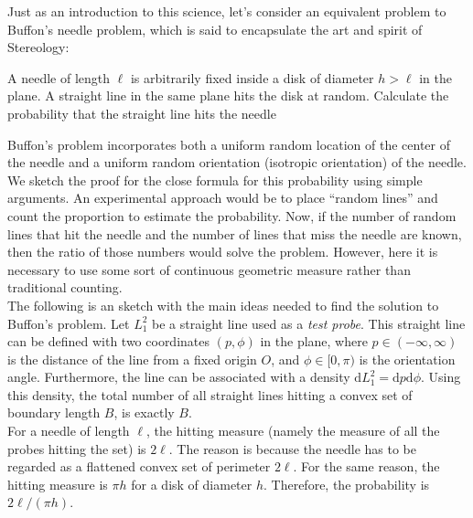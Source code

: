 Just as an introduction to this science, let's consider an equivalent problem to Buffon's needle problem, which is said to encapsulate the art and spirit of Stereology:\\
\begin{tcolorbox}
A needle of length $\ell$ is arbitrarily fixed inside a disk of diameter $h > \ell$ in the plane. A straight line in the same plane hits the disk at random. Calculate the probability that the straight line hits the needle\\
\end{tcolorbox}
Buffon's problem incorporates both a uniform random location of the center of the needle and a uniform random orientation (isotropic orientation) of the needle. We sketch the proof for the close formula for this probability using simple arguments. 
An experimental approach would be to place ``random lines'' and count the proportion to estimate the probability.  
Now, if the number of random lines that hit the needle and the number of lines that miss the needle are known, then the ratio of those numbers would solve the problem. However, here it is necessary to use some sort of continuous geometric measure rather than traditional counting.\\

The following is an sketch with the main ideas needed to find the solution to Buffon's problem.
Let $L_1^2$ be a straight line used as a \textit{test probe}. This straight line can be defined with two coordinates $(p,\phi)$ in the plane, where $p \in (-\infty,\infty)$ is the distance of the line from a fixed origin $O$, and $\phi \in [0,\pi)$ is the orientation angle. Furthermore, the line can be associated with a density $\mathrm{d}L_1^2=\mathrm{d}p\mathrm{d}\phi$. Using this density, the total number of all straight lines hitting a convex set of boundary length $B$, is exactly $B$.\\

For a needle of length $\ell$, the hitting measure (namely the measure of all the probes hitting the set) is $2\ell$. The reason is because the needle has to be regarded as a flattened convex set of perimeter $2\ell$. For the same reason, the hitting measure is $\pi h$ for a disk of diameter $h$. Therefore, the probability is $2\ell/(\pi h)$.\\


